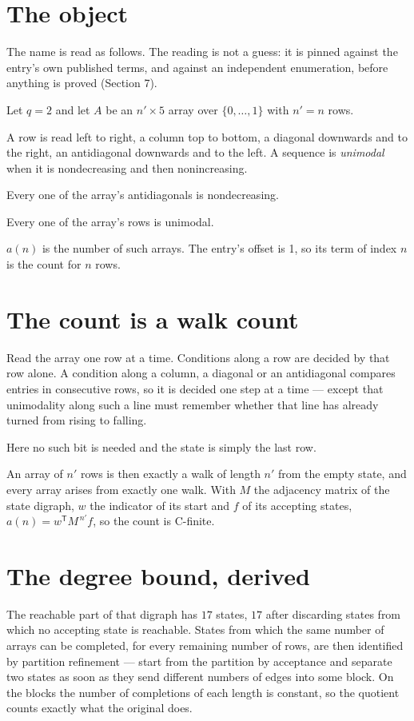 \documentclass[11pt]{article}
\theoremstyle{definition}
\begin{document}
\section{The object}

The name is read as follows. The reading is not a guess: it is pinned against the entry's own published terms, and against an independent enumeration, before anything is proved (Section 7).

Let $q = 2$ and let $A$ be an $n' \times 5$ array over $\{0,\dots,1\}$ with $n' = n$ rows.

A row is read left to right, a column top to bottom, a diagonal downwards and to the right, an antidiagonal downwards and to the left. A sequence is {\itshape unimodal} when it is nondecreasing and then nonincreasing.

Every one of the array's antidiagonals is nondecreasing.

Every one of the array's rows is unimodal.

$a(n)$ is the number of such arrays. The entry's offset is 1, so its term of index $n$ is the count for $n$ rows.

\section{The count is a walk count}

Read the array one row at a time. Conditions along a row are decided by that row alone. A condition along a column, a diagonal or an antidiagonal compares entries in consecutive rows, so it is decided one step at a time --- except that unimodality along such a line must remember whether that line has already turned from rising to falling.

Here no such bit is needed and the state is simply the last row.

An array of $n'$ rows is then exactly a walk of length $n'$ from the empty state, and every array arises from exactly one walk. With $M$ the adjacency matrix of the state digraph, $w$ the indicator of its start and $f$ of its accepting states, $a(n) = w^{\mathsf T}M^{\,n'}f$, so the count is C-finite.

\section{The degree bound, derived}

The reachable part of that digraph has $17$ states, $17$ after discarding states from which no accepting state is reachable. States from which the same number of arrays can be completed, for every remaining number of rows, are then identified by partition refinement --- start from the partition by acceptance and separate two states as soon as they send different numbers of edges into some block. On the blocks the number of completions of each length is constant, so the quotient counts exactly what the original does.
\end{document}
